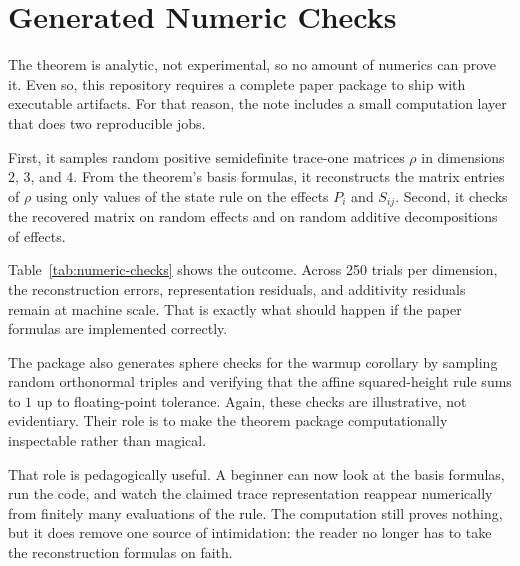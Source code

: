 \section{Generated Numeric Checks}



The theorem is analytic, not experimental, so no amount of numerics can prove it. Even so, this repository requires a complete paper package to ship with executable artifacts. For that reason, the note includes a small computation layer that does two reproducible jobs.

First, it samples random positive semidefinite trace-one matrices $\rho$ in dimensions $2$, $3$, and $4$. From the theorem's basis formulas, it reconstructs the matrix entries of $\rho$ using only values of the state rule on the effects $P_i$ and $S_{ij}$. Second, it checks the recovered matrix on random effects and on random additive decompositions of effects.

Table~\ref{tab:numeric-checks} shows the outcome. Across 250 trials per dimension, the reconstruction errors, representation residuals, and additivity residuals remain at machine scale. That is exactly what should happen if the paper formulas are implemented correctly.

The package also generates sphere checks for the warmup corollary by sampling random orthonormal triples and verifying that the affine squared-height rule sums to $1$ up to floating-point tolerance. Again, these checks are illustrative, not evidentiary. Their role is to make the theorem package computationally inspectable rather than magical.

That role is pedagogically useful. A beginner can now look at the basis formulas, run the code, and watch the claimed trace representation reappear numerically from finitely many evaluations of the rule. The computation still proves nothing, but it does remove one source of intimidation: the reader no longer has to take the reconstruction formulas on faith.
